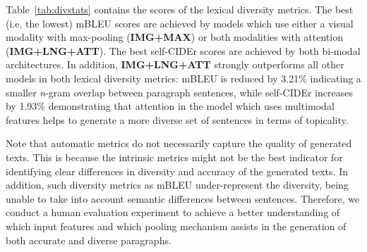 \documentclass[11pt,a4paper]{article}
\begin{document}



Table~\ref{tab:divstats} contains the scores of the lexical diversity metrics. %
The best (i.e. the lowest) mBLEU scores are achieved by models which use either a visual modality with max-pooling (\textbf{IMG+MAX}) or both modalities with attention (\textbf{IMG+LNG+ATT}).
The best self-CIDEr scores are achieved by both bi-modal architectures.
In addition, \textbf{IMG+LNG+ATT} strongly outperforms all other models in both lexical diversity metrics: mBLEU is reduced by 3.21\% indicating a smaller \textit{n}-gram overlap between paragraph sentences, while self-CIDEr increases by 1.93\% demonstrating that attention in the model which uses multimodal features helps to generate a more diverse set of sentences in terms of topicality.

Note that automatic metrics do not necessarily capture the quality of generated texts. %
This %
is because the intrinsic metrics might not be the best indicator for identifying clear differences in diversity and accuracy of the generated texts.
In addition, such diversity metrics as mBLEU under-represent the diversity, being unable to take into account semantic differences between sentences.
Therefore, we conduct a human evaluation experiment to achieve a better understanding of which input features and which pooling mechanism assists in the generation of both accurate and diverse paragraphs.
\end{document}
